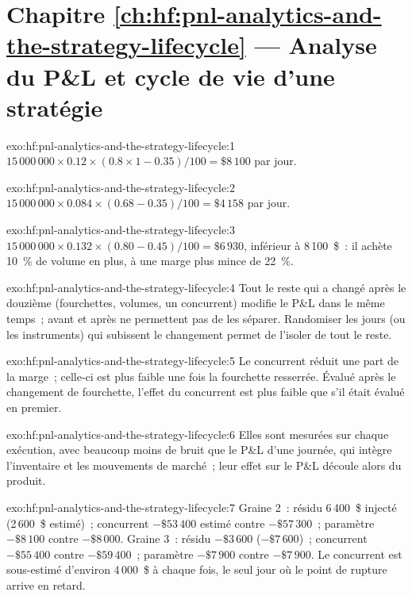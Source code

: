 \section*{Chapitre \ref{ch:hf:pnl-analytics-and-the-strategy-lifecycle} --- Analyse du P\&L et cycle de vie d'une stratégie}

\begin{solution}{exo:hf:pnl-analytics-and-the-strategy-lifecycle:1}
$15\,000\,000\times0.12\times(0.8\times1-0.35)/100=\$8\,100$ par jour.
\end{solution}

\begin{solution}{exo:hf:pnl-analytics-and-the-strategy-lifecycle:2}
$15\,000\,000\times0.084\times(0.68-0.35)/100=\$4\,158$ par jour.
\end{solution}

\begin{solution}{exo:hf:pnl-analytics-and-the-strategy-lifecycle:3}
$15\,000\,000\times0.132\times(0.80-0.45)/100=\$6\,930$, inférieur à 8\,100~\$~: il achète 10~\% de volume en plus, à une marge plus mince de 22~\%.
\end{solution}

\begin{solution}{exo:hf:pnl-analytics-and-the-strategy-lifecycle:4}
Tout le reste qui a changé après le douzième (fourchettes, volumes, un concurrent) modifie le P\&L dans le même temps~; avant et après ne permettent pas
de les séparer. Randomiser les jours (ou les instruments) qui subissent le changement permet de l'isoler de tout le reste.
\end{solution}

\begin{solution}{exo:hf:pnl-analytics-and-the-strategy-lifecycle:5}
Le concurrent réduit une part de la marge~; celle-ci est plus faible une fois la fourchette resserrée. Évalué après le changement de fourchette, l'effet du
concurrent est plus faible que s'il était évalué en premier.
\end{solution}

\begin{solution}{exo:hf:pnl-analytics-and-the-strategy-lifecycle:6}
Elles sont mesurées sur chaque exécution, avec beaucoup moins de bruit que le P\&L d'une journée, qui intègre l'inventaire et les mouvements de marché~; leur effet sur le P\&L
découle alors du produit.
\end{solution}

\begin{solution}{exo:hf:pnl-analytics-and-the-strategy-lifecycle:7}
Graine 2~: résidu 6\,400~\$ injecté (2\,600~\$ estimé)~; concurrent $-\$53\,400$ estimé contre $-\$57\,300$~; paramètre $-\$8\,100$ contre $-\$8\,000$.
Graine 3~: résidu $-\$3\,600$ ($-\$7\,600$)~; concurrent $-\$55\,400$ contre $-\$59\,400$~; paramètre $-\$7\,900$ contre $-\$7\,900$. Le concurrent est
sous-estimé d'environ 4\,000~\$ à chaque fois, le seul jour où le point de rupture arrive en retard.
\end{solution}

